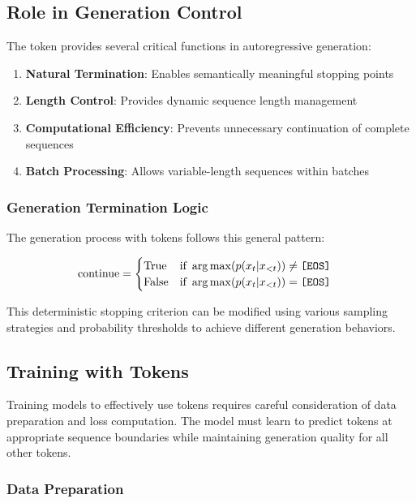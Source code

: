 \subsection{Role in Generation Control}

The \eos{} token provides several critical functions in autoregressive generation:

\begin{enumerate}
\item \textbf{Natural Termination}: Enables semantically meaningful stopping points
\item \textbf{Length Control}: Provides dynamic sequence length management
\item \textbf{Computational Efficiency}: Prevents unnecessary continuation of complete sequences
\item \textbf{Batch Processing}: Allows variable-length sequences within batches
\end{enumerate}

\subsubsection{Generation Termination Logic}

The generation process with \eos{} tokens follows this general pattern:

\begin{align}
\text{continue} &= \begin{cases} 
\text{True} & \text{if } \arg\max(p(x_t | x_{<t})) \neq \text{\texttt{[EOS]}{}} \\
\text{False} & \text{if } \arg\max(p(x_t | x_{<t})) = \text{\texttt{[EOS]}{}}
\end{cases}
\end{align}

This deterministic stopping criterion can be modified using various sampling strategies and probability thresholds to achieve different generation behaviors.

\subsection{Training with \eos{} Tokens}

Training models to effectively use \eos{} tokens requires careful consideration of data preparation and loss computation. The model must learn to predict \eos{} tokens at appropriate sequence boundaries while maintaining generation quality for all other tokens.

\subsubsection{Data Preparation}

